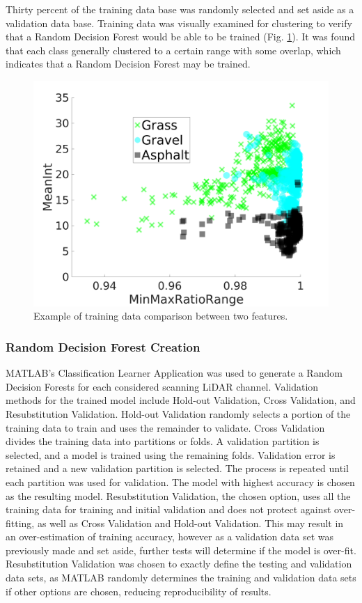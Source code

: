 \documentclass[numbered,pdftex]{ohio-etd}
\begin{document}
{{{{				{Thirty percent of the training data base was randomly selected and set aside as a validation data base. Training data was visually examined for clustering to verify that a Random Decision Forest would be able to be trained (Fig. \ref{fig:range_training_data_cluster_3}). It was found that each class generally clustered to a certain range with some overlap, which indicates that a Random Decision Forest may be trained.}
				
				\begin{figure}[H]
					\centering
					\includegraphics[width=0.75\linewidth]{Defense_Images/training_data_cluster_3}
					\caption[Example Clustering]{Example of training data comparison between two features.}
					\label{fig:range_training_data_cluster_3}
				\end{figure}
				
			} %
			
			\subsubsection{Random Decision Forest Creation}\label{sec:random-decision-forest-creation}{
				
				{MATLAB's Classification Learner Application was used to generate a Random Decision Forests for each considered scanning LiDAR channel. Validation methods for the trained model include Hold-out Validation, Cross Validation, and Resubstitution Validation. Hold-out Validation randomly selects a portion of the training data to train and uses the remainder to validate. Cross Validation divides the training data into partitions or folds. A validation partition is selected, and a model is trained using the remaining folds. Validation error is retained and a new validation partition is selected. The process is repeated until each partition was used for validation. The model with highest accuracy is chosen as the resulting model. Resubstitution Validation, the chosen option, uses all the training data for training and initial validation and does not protect against over-fitting, as well as Cross Validation and Hold-out Validation. This may result in an over-estimation of training accuracy, however as a validation data set was previously made and set aside, further tests will determine if the model is over-fit. Resubstitution Validation was chosen to exactly define the testing and validation data sets, as MATLAB randomly determines the training and validation data sets if other options are chosen, reducing reproducibility of results.}
				
}}}}
\end{document}
